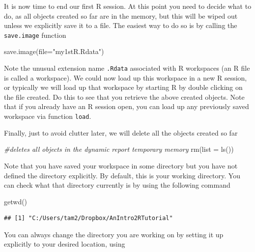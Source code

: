\documentclass[
]{article}
\newenvironment{Shaded}{\begin{snugshade}}{\end{snugshade}}
\newcommand{\AttributeTok}[1]{\textcolor[rgb]{0.77,0.63,0.00}{#1}}
\newcommand{\CommentTok}[1]{\textcolor[rgb]{0.56,0.35,0.01}{\textit{#1}}}
\newcommand{\FunctionTok}[1]{\textcolor[rgb]{0.00,0.00,0.00}{#1}}
\newcommand{\NormalTok}[1]{#1}
\newcommand{\StringTok}[1]{\textcolor[rgb]{0.31,0.60,0.02}{#1}}
\begin{document}
It is now time to end our first R session. At this point you need to
decide what to do, as all objects created so far are in the memory, but
this will be wiped out unless we explicitly save it to a file. The
easiest way to do so is by calling the \texttt{save.image} function

\begin{Shaded}
\begin{Highlighting}[]
\FunctionTok{save.image}\NormalTok{(}\AttributeTok{file=}\StringTok{"my1stR.Rdata"}\NormalTok{)}
\end{Highlighting}
\end{Shaded}

Note the unusual extension name \texttt{.Rdata} associated with R
workspaces (an R file is called a workspace). We could now load up this
workspace in a new R session, or typically we will load up that
workspace by starting R by double clicking on the file created. Do this
to see that you retrieve the above created objects. Note that if you
already have an R session open, you can load up any previously saved
workspace via function \texttt{load}.

Finally, just to avoid clutter later, we will delete all the objects
created so far

\begin{Shaded}
\begin{Highlighting}[]
\CommentTok{\#deletes all objects in the dynamic report temporary memory}
\FunctionTok{rm}\NormalTok{(}\AttributeTok{list =} \FunctionTok{ls}\NormalTok{())}
\end{Highlighting}
\end{Shaded}

Note that you have saved your workspace in some directory but you have
not defined the directory explicitly. By default, this is your working
directory. You can check what that directory currently is by using the
following command

\begin{Shaded}
\begin{Highlighting}[]
\FunctionTok{getwd}\NormalTok{()}
\end{Highlighting}
\end{Shaded}

\begin{verbatim}
## [1] "C:/Users/tam2/Dropbox/AnIntro2RTutorial"
\end{verbatim}

You can always change the directory you are working on by setting it up
explicitly to your desired location, using
\end{document}
